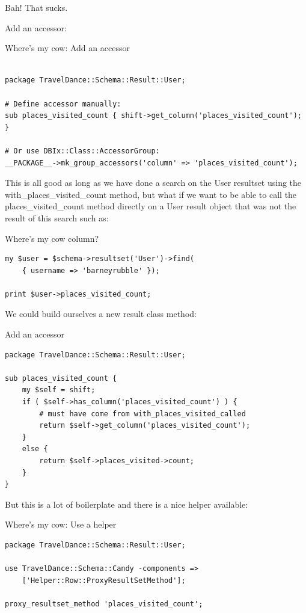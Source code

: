 Bah! That sucks.

Add an accessor:

\begin{frame}[fragile]{Where's my cow: Add an accessor}
\begin{lstlisting}

package TravelDance::Schema::Result::User;

# Define accessor manually:
sub places_visited_count { shift->get_column('places_visited_count'); }

# Or use DBIx::Class::AccessorGroup:
__PACKAGE__->mk_group_accessors('column' => 'places_visited_count');

\end{lstlisting}
\end{frame}

This is all good as long as we have done a search on the User resultset
using the with\_places\_visited\_count method, but what if we want to be able to call
the places\_visited\_count method directly on a User result object that was not the
result of this search such as:

\begin{frame}[fragile]{Where's my cow column?}
\begin{lstlisting}
my $user = $schema->resultset('User')->find(
    { username => 'barneyrubble' });

print $user->places_visited_count;
\end{lstlisting}
\end{frame}

We could build ourselves a new result class method:

\begin{frame}[fragile]{Add an accessor}
\begin{lstlisting}
package TravelDance::Schema::Result::User;

sub places_visited_count {
    my $self = shift;
    if ( $self->has_column('places_visited_count') ) {
        # must have come from with_places_visited_called
        return $self->get_column('places_visited_count');
    }
    else {
        return $self->places_visited->count;
    }
}
\end{lstlisting}
\end{frame}

But this is a lot of boilerplate and there is a nice helper available:

\begin{frame}[fragile]{Where's my cow: Use a helper}
\begin{lstlisting}
package TravelDance::Schema::Result::User;

use TravelDance::Schema::Candy -components =>
    ['Helper::Row::ProxyResultSetMethod'];

proxy_resultset_method 'places_visited_count';
\end{lstlisting}
\end{frame}

